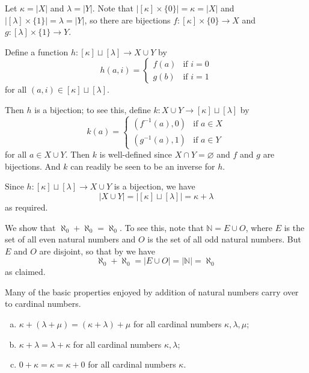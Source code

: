 \begin{cproof}
Let $\kappa = |X|$ and $\lambda = |Y|$. Note that $|[\kappa] \times \{ 0 \}| = \kappa = |X|$ and $|[\lambda] \times \{ 1 \}| = \lambda = |Y|$, so there are bijections $f : [\kappa] \times \{ 0 \} \to X$ and $g : [\lambda] \times \{ 1 \} \to Y$.

Define a function $h : [\kappa] \sqcup [\lambda] \to X \cup Y$ by
\[ h(a,i) = \begin{cases} f(a) & \text{if } i=0 \\ g(b) & \text{if } i=1 \end{cases} \]
for all $(a,i) \in [\kappa] \sqcup [\lambda]$.

Then $h$ is a bijection; to see this, define $k : X \cup Y \to [\kappa] \sqcup [\lambda]$ by
\[ k(a) = \begin{cases} (f^{-1}(a), 0) & \text{if } a \in X \\ (g^{-1}(a), 1) & \text{if } a \in Y \end{cases} \]
for all $a \in X \cup Y$. Then $k$ is well-defined since $X \cap Y = \varnothing$ and $f$ and $g$ are bijections. And $k$ can readily be seen to be an inverse for $h$.

Since $h : [\kappa] \sqcup [\lambda] \to X \cup Y$ is a bijection, we have
\[ |X \cup Y| = |[\kappa] \sqcup [\lambda]| = \kappa + \lambda \]
as required.
\end{cproof}

\begin{example}
\label{exAlephNaughtPlusAlephNaughtEqualsAlephNaught}
We show that $\aleph_0 + \aleph_0 = \aleph_0$. To see this, note that $\mathbb{N} = E \cup O$, where $E$ is the set of all even natural numbers and $O$ is the set of all odd natural numbers. But $E$ and $O$ are disjoint, so that by  we have
\[ \aleph_0 + \aleph_0 = |E \cup O| = |\mathbb{N}| = \aleph_0 \]
as claimed.
\end{example}

Many of the basic properties enjoyed by addition of natural numbers carry over to cardinal numbers.

\begin{theorem}
\label{thmPropertiesOfCardinalAddition}
\fixlistskip
\begin{enumerate}[(a)]
\item $\kappa + (\lambda + \mu) = (\kappa + \lambda) + \mu$ for all cardinal numbers $\kappa, \lambda, \mu$;
\item $\kappa + \lambda = \lambda + \kappa$ for all cardinal numbers $\kappa, \lambda$;
\item $0 + \kappa = \kappa = \kappa + 0$ for all cardinal numbers $\kappa$.
\end{enumerate}
\end{theorem}

